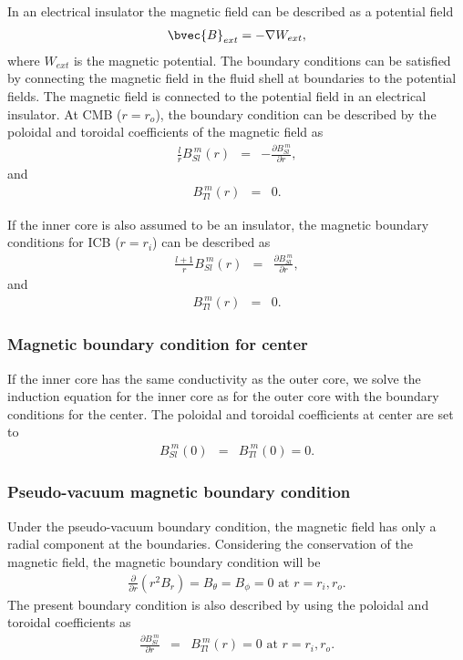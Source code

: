 In an electrical insulator the magnetic field can be described as a potential field
\begin{eqnarray}
\bvec{B}_{ext} = - \nabla W_{ext},
\nonumber
\end{eqnarray}
%
where $W_{ext}$ is the magnetic potential. The boundary conditions can be satisfied by  connecting the magnetic field in the fluid shell at boundaries to the potential fields. The magnetic field is connected to the potential field in an electrical insulator. At CMB ($r = r_{o}$), the boundary condition can be described by the poloidal and toroidal coefficients of the magnetic field as
%
\begin{eqnarray}
\frac{l}{r} B_{Sl}^{\ m}(r) & = & - \frac{\partial B_{Sl}^{\ m}}{\partial r},
\nonumber
\end{eqnarray}
%
and 
%
\begin{eqnarray}
B_{Tl}^{\ m}(r) & = & 0.
\nonumber
\end{eqnarray}
%

If the inner core is also assumed to be an insulator, the magnetic boundary conditions for ICB ($r = r_{i}$) can be described as
%
\begin{eqnarray}
\frac{l+1}{r} B_{Sl}^{\ m}(r) & = & \frac{\partial B_{Sl}^{\ m}}{\partial r},
\nonumber
\end{eqnarray}
%
and 
%
\begin{eqnarray}
B_{Tl}^{\ m}(r) & = & 0.
\nonumber
\end{eqnarray}
%

\subsubsection{Magnetic boundary condition for center}
If the inner core has the same conductivity as the outer core, we solve the induction equation for the inner core as for the outer core with the boundary conditions for the center. The poloidal and toroidal coefficients at center are set to 
%
\begin{eqnarray}
B_{Sl}^{\ m}(0) &=& B_{Tl}^{\ m}(0) = 0.
\nonumber
\end{eqnarray}
%

\subsubsection{Pseudo-vacuum magnetic boundary condition}
Under the pseudo-vacuum boundary condition, the magnetic field has only a radial component at the boundaries. Considering the conservation of the magnetic field, the magnetic boundary condition will be
%
\begin{eqnarray}
\frac{\partial}{\partial r}\left(r^{2} B_{r} \right) =  B_{\theta} = B_{\phi} = 0
 \mbox{ at } r = r_{i}, r_{o}.
\nonumber
\end{eqnarray}
%
The present boundary condition is also described by using the poloidal and toroidal coefficients as
%
\begin{eqnarray}
\frac{\partial B_{Sl}^{\ m}}{\partial r} & = &  B_{Tl}^{\ m}(r) = 0
 \mbox{ at } r = r_{i}, r_{o}.
\nonumber
\end{eqnarray}
